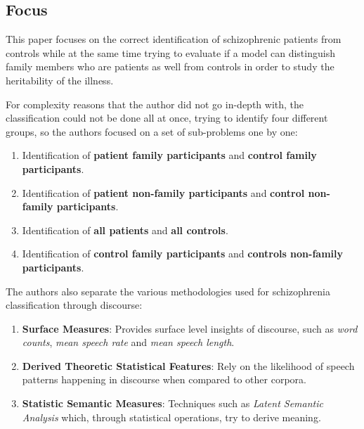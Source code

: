 \documentclass{Paper_Summary}
\begin{document}
\makepapertitle

\breakline

\begin{center}
    \section*{Focus}
\end{center}

    This paper focuses on the correct identification of schizophrenic patients from controls while at the same time trying to evaluate if a model can distinguish family members who are patients as well from controls in order to study the heritability of the illness.

    For complexity reasons that the author did not go in-depth with, the classification could not be done all at once, trying to identify four different groups, so the authors focused on a set of sub-problems one by one:
    \begin{enumerate}
        \item Identification of \textbf{patient family participants} and \textbf{control family participants}.
        \item Identification of \textbf{patient non-family participants} and \textbf{control non-family participants}.
        \item Identification of \textbf{all patients} and \textbf{all controls}.
        \item Identification of \textbf{control family participants} and \textbf{controls non-family participants}.
    \end{enumerate}

    The authors also separate the various methodologies used for schizophrenia classification through discourse:
    \begin{enumerate}
        \item \textbf{Surface Measures}: Provides surface level insights of discourse, such as \emph{word counts}, \emph{mean speech rate} and \emph{mean speech length}.
        \item \textbf{Derived Theoretic Statistical Features}: Rely on the likelihood of speech patterns happening in discourse when compared to other corpora.
        \item \textbf{Statistic Semantic Measures}: Techniques such as \emph{Latent Semantic Analysis} which, through statistical operations, try to derive meaning.
    \end{enumerate}
\end{document}
